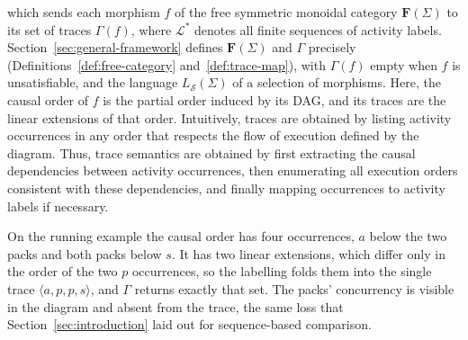 which sends each morphism $f$ of the free symmetric monoidal category $\mathbf{F}(\Sigma)$ to its set of traces $\Gamma(f)$, where $\mathcal{L}^\ast$ denotes all finite sequences of activity labels. Section~\ref{sec:general-framework} defines $\mathbf{F}(\Sigma)$ and $\Gamma$ precisely (Definitions~\ref{def:free-category} and~\ref{def:trace-map}), with $\Gamma(f)$ empty when $f$ is unsatisfiable, and the language $L_{\mathcal{S}}(\Sigma)$ of a selection of morphisms. Here, the causal order of $f$ is the partial order induced by its DAG, and its traces are the linear extensions of that order. Intuitively, traces are obtained by listing activity occurrences in any order that respects the flow of execution defined by the diagram. Thus, trace semantics are obtained by first extracting the causal dependencies between activity occurrences, then enumerating all execution orders consistent with these dependencies, and finally mapping occurrences to activity labels if necessary.

On the running example the causal order has four occurrences, $a$ below the two
packs and both packs below $s$. It has two linear extensions, which differ only
in the order of the two $p$ occurrences, so the labelling folds them into the
single trace $\langle a,p,p,s\rangle$, and $\Gamma$ returns exactly that set.
The packs' concurrency is visible in the diagram and absent from the trace,
the same loss that Section~\ref{sec:introduction} laid out for sequence-based
comparison.

